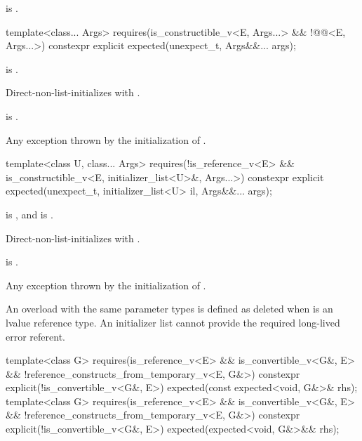 \begin{itemdescr}
\pnum
\ensures
{} is .
\end{itemdescr}

%
\begin{itemdecl}
template<class... Args>
  requires(is_constructible_v<E, Args...> && !@@<E, Args...>)
constexpr explicit expected(unexpect_t, Args&&... args);
\end{itemdecl}

\begin{itemdescr}
\pnum
\constraints
{} is .

\pnum
\effects
Direct-non-list-initializes  with .

\pnum
\ensures
{} is .

\pnum
\throws
Any exception thrown by the initialization of .
\end{itemdescr}

%
\begin{itemdecl}
template<class U, class... Args>
  requires(!is_reference_v<E> && is_constructible_v<E, initializer_list<U>&, Args...>)
constexpr explicit expected(unexpect_t, initializer_list<U> il, Args&&... args);
\end{itemdecl}

\begin{itemdescr}
\pnum
\constraints
{} is , and  is .

\pnum
\effects
Direct-non-list-initializes  with .

\pnum
\ensures
{} is .

\pnum
\throws
Any exception thrown by the initialization of .

\pnum
\remarks
An overload with the same parameter types is defined as deleted when  is an lvalue reference type. An initializer list cannot provide the required long-lived error referent.
\end{itemdescr}

%
\begin{itemdecl}
template<class G>
  requires(is_reference_v<E> && is_convertible_v<G&, E> &&
           !reference_constructs_from_temporary_v<E, G&>)
constexpr explicit(!is_convertible_v<G&, E>) expected(const expected<void, G&>& rhs);
template<class G>
  requires(is_reference_v<E> && is_convertible_v<G&, E> &&
           !reference_constructs_from_temporary_v<E, G&>)
constexpr explicit(!is_convertible_v<G&, E>) expected(expected<void, G&>&& rhs);
\end{itemdecl}

